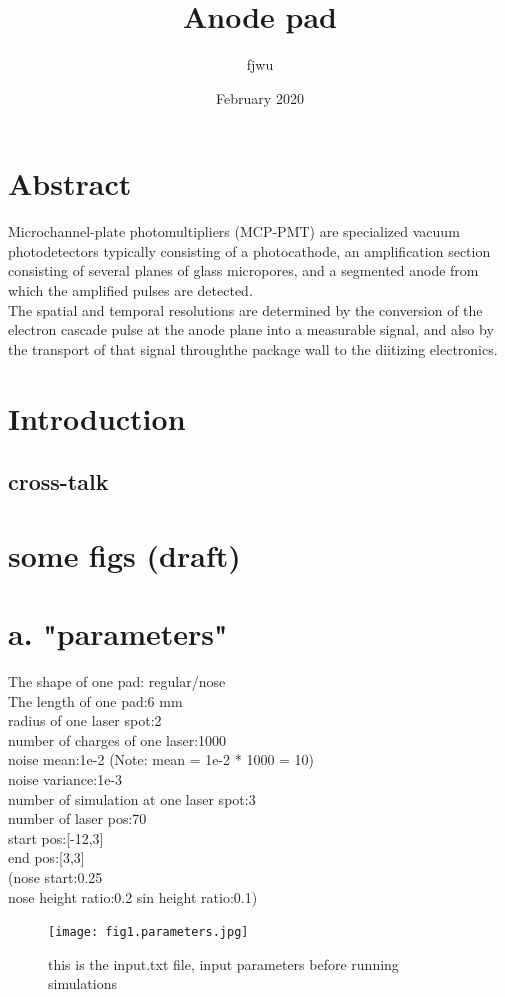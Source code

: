 \documentclass{article}
\title{Anode pad}
\author{fjwu }
\date{February 2020}
\begin{document}
\maketitle
\section{Abstract}
Microchannel-plate photomultipliers (MCP-PMT) are specialized vacuum photodetectors typically consisting of a photocathode, an amplification section consisting of several planes of glass micropores, and a segmented anode from which the amplified pulses are detected. \\
The spatial and temporal resolutions are determined by the conversion of the electron cascade pulse at the anode plane into a measurable signal, and also by the transport of that signal throughthe package wall to the diitizing electronics. 

\section{Introduction}

\subsection{cross-talk}



\section{some figs (draft)}

\section{a. "parameters"}
The shape of one pad: regular/nose\\
The length of one pad:6 mm\\
radius of one laser spot:2\\
number of charges of one laser:1000\\
noise mean:1e-2 (Note: mean = 1e-2 * 1000 = 10)\\
noise variance:1e-3\\
number of simulation at one laser spot:3\\
number of laser pos:70\\
start pos:[-12,3]\\
end pos:[3,3]\\
(nose start:0.25\\
nose height ratio:0.2
sin height ratio:0.1)\\
\begin{figure}
\texttt{[image: fig1.parameters.jpg]}
\caption{this is the input.txt file, input parameters before running simulations}
\end{figure}
\end{document}
